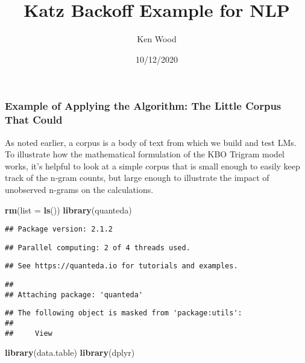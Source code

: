 \documentclass[
]{article}
\title{Katz Backoff Example for NLP}
\author{Ken Wood}
\date{10/12/2020}
\newenvironment{Shaded}{\begin{snugshade}}{\end{snugshade}}
\newcommand{\DataTypeTok}[1]{\textcolor[rgb]{0.13,0.29,0.53}{#1}}
\newcommand{\KeywordTok}[1]{\textcolor[rgb]{0.13,0.29,0.53}{\textbf{#1}}}
\newcommand{\NormalTok}[1]{#1}
\begin{document}
\maketitle

\hypertarget{example-of-applying-the-algorithm-the-little-corpus-that-could}{%
\subsubsection{Example of Applying the Algorithm: The Little Corpus That
Could}\label{example-of-applying-the-algorithm-the-little-corpus-that-could}}

As noted earlier, a corpus is a body of text from which we build and
test LMs. To illustrate how the mathematical formulation of the KBO
Trigram model works, it's helpful to look at a simple corpus that is
small enough to easily keep track of the n-gram counts, but large enough
to illustrate the impact of unobserved n-grams on the calculations.

\begin{Shaded}
\begin{Highlighting}[]
\KeywordTok{rm}\NormalTok{(}\DataTypeTok{list =} \KeywordTok{ls}\NormalTok{())}
\KeywordTok{library}\NormalTok{(quanteda)}
\end{Highlighting}
\end{Shaded}

\begin{verbatim}
## Package version: 2.1.2
\end{verbatim}

\begin{verbatim}
## Parallel computing: 2 of 4 threads used.
\end{verbatim}

\begin{verbatim}
## See https://quanteda.io for tutorials and examples.
\end{verbatim}

\begin{verbatim}
## 
## Attaching package: 'quanteda'
\end{verbatim}

\begin{verbatim}
## The following object is masked from 'package:utils':
## 
##     View
\end{verbatim}

\begin{Shaded}
\begin{Highlighting}[]
\KeywordTok{library}\NormalTok{(data.table)}
\KeywordTok{library}\NormalTok{(dplyr)}
\end{Highlighting}
\end{Shaded}
\end{document}
